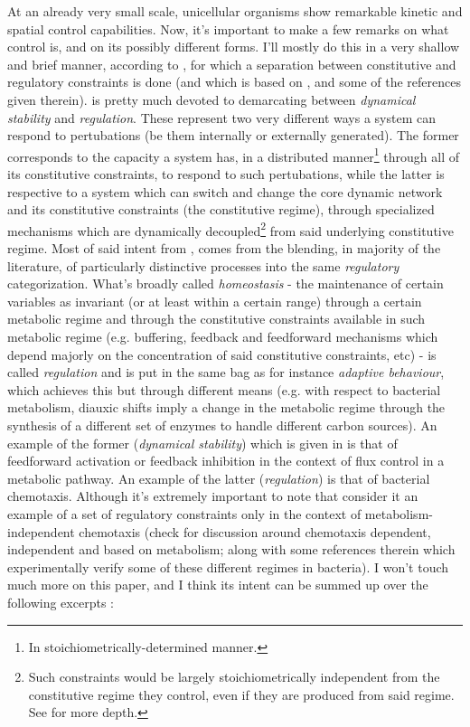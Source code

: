 \documentclass[a4paper,12pt,twoside,leqno]{article}
\begin{document}
At an already very small scale, unicellular organisms show remarkable kinetic and spatial control capabilities. Now, it's important to make a few remarks on what control is, and on its possibly different forms. I'll mostly do this in a very shallow and brief manner, according to  \citet{bich2016biological}, for which a separation between constitutive and regulatory constraints is done (and which is based on \cite{moreno2015biological}, and some of the references given therein).
\citet{bich2016biological} is pretty much devoted to demarcating between \textit{dynamical stability} and \textit{regulation}. These represent two very different ways a system can respond to pertubations (be them internally or externally generated). The former corresponds to the capacity a system has, in a distributed manner\footnote{In stoichiometrically-determined manner.} through all of its constitutive constraints, to respond to such pertubations, while the latter is respective to a system which can switch and change the core dynamic network and its constitutive constraints (the constitutive regime), through specialized mechanisms which are dynamically decoupled\footnote{Such constraints would be largely stoichiometrically independent from the constitutive regime they control, even if they are produced from said regime. See \citet{bich2016biological} for more depth.} from said underlying constitutive regime. Most of said intent from \citet{bich2016biological}, comes from the blending, in majority of the literature, of particularly distinctive processes into the same \textit{regulatory} categorization. What's broadly called \textit{homeostasis} - the maintenance of certain variables as invariant (or at least within a certain range) through a certain metabolic regime and through the constitutive constraints available in such metabolic regime (e.g. buffering, feedback and feedforward mechanisms which depend majorly on the concentration of said constitutive constraints, etc) - is called \textit{regulation} and is put in the same bag as for instance \textit{adaptive behaviour}, which achieves this but through different means (e.g. with respect to bacterial metabolism, diauxic shifts imply a change in the metabolic regime through the synthesis of a different set of enzymes to handle different carbon sources). An example of the former (\textit{dynamical stability}) which is given in \citet{bich2016biological} is that of feedforward activation or feedback inhibition in the context of flux control in a metabolic pathway. An example of the latter (\textit{regulation}) is that of bacterial chemotaxis. Although it's extremely important to note that \citet{bich2016biological} consider it an example of a set of regulatory constraints only in the context of metabolism-independent chemotaxis (check \citet{egbert2010minimal} for discussion around chemotaxis dependent, independent and based on metabolism; along with some references therein which experimentally verify some of these different regimes in bacteria). I won't touch much more on this paper, and I think its intent can be summed up over the following excerpts \citep{bich2016biological}:
\end{document}

